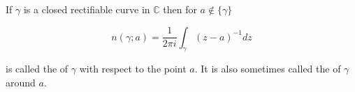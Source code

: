 If $\gamma$ is a closed rectifiable curve in $\mathbb{C}$ then for $a \notin \{\gamma\}$

$$n(\gamma; a) = \frac{1}{2\pi i} \int_{\gamma}(z - a)^{-1} dz$$

is called the  of $\gamma$ with respect to the point $a$. It is also sometimes called the  of $\gamma$ around $a$.
